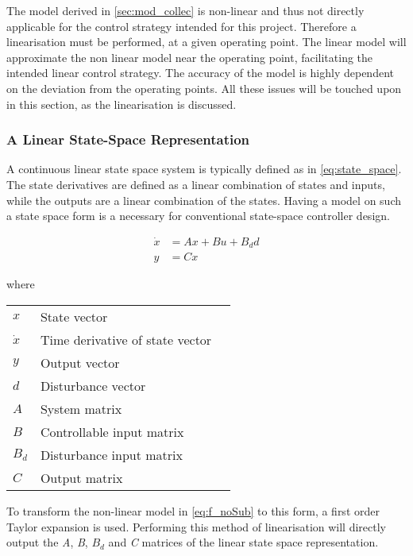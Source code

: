 The model derived in \cref{sec:mod_collec} is non-linear and thus not directly applicable for the control strategy intended for this project. Therefore a linearisation must be performed, at a given operating point. The linear model will approximate the non linear model near the operating point, facilitating the intended linear control strategy. The accuracy of the model is highly dependent on the deviation from the operating points. All these issues will be touched upon in this section, as the linearisation is discussed.

\subsubsection{A Linear State-Space Representation}
A continuous linear state space system is typically defined as in \cref{eq:state_space}. The state derivatives are defined as a linear combination of states and inputs, while the outputs are a linear combination of the states. Having a model on such a state space form is a necessary for conventional state-space controller design.

\begin{equation} \label{eq:state_space}
	\begin{split}
		\dot{x} & = Ax + Bu + B_dd \\
		y 		& = Cx
	\end{split}
\end{equation}

where

\begin{center}
	\begin{tabular}{l p{8cm} l}
		$x$       & State vector                    &  \\
		$\dot{x}$ & Time derivative of state vector &  \\
		$y$       & Output vector                   &  \\
		$d$       & Disturbance vector              &  \\
		$A$       & System matrix                   &  \\
		$B$       & Controllable input matrix       &  \\
		$B_d$     & Disturbance input matrix        &  \\
		$C$       & Output matrix                   &
	\end{tabular}
\end{center}

To transform the non-linear model in \cref{eq:f_noSub} to this form, a first order Taylor expansion is used. Performing this method of linearisation will directly output the \textit{A}, \textit{B}, \textit{$B_d$} and \textit{C} matrices of the linear state space representation.

